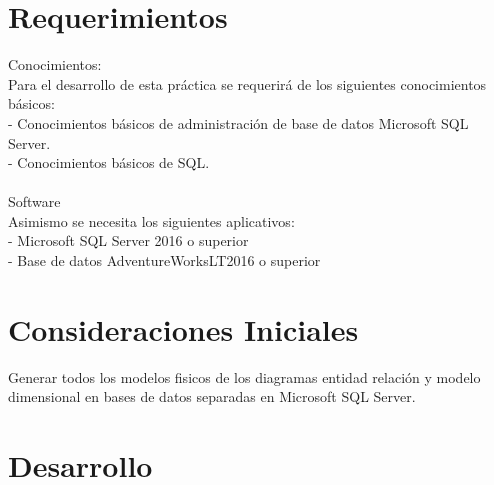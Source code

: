 \documentclass[12pt,letterpaper]{article}
\begin{document}
\section{Requerimientos}
Conocimientos:
\\Para el desarrollo de esta práctica se requerirá de los siguientes conocimientos básicos:
\\- Conocimientos básicos de administración de base de datos Microsoft SQL Server.
\\- Conocimientos básicos de SQL.
\\\\Software
\\Asimismo se necesita los siguientes aplicativos:
\\- Microsoft SQL Server 2016 o superior
\\- Base de datos AdventureWorksLT2016 o superior

\section{Consideraciones Iniciales}
Generar todos los modelos fisicos de los diagramas entidad relación y modelo dimensional en bases de datos
separadas en Microsoft SQL Server.


\section{Desarrollo}
\end{document}
